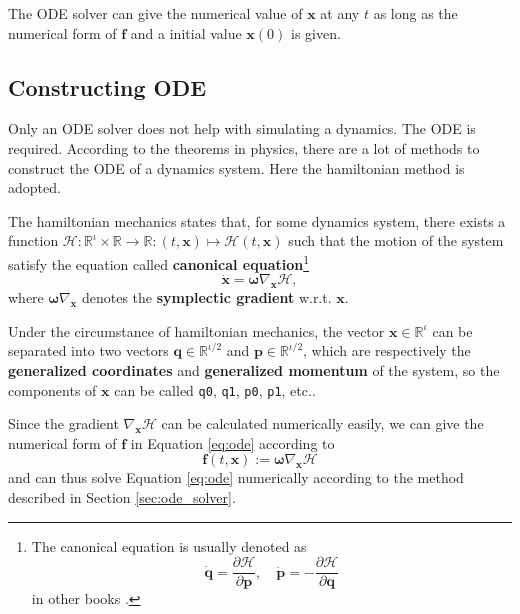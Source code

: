 \documentclass[12pt]{article}
\begin{document}
The ODE solver can give the numerical value of $\mathbf x$ at any $t$
as long as the numerical form of $\mathbf f$
and a initial value $\mathbf x\left(0\right)$
is given.

\subsection{Constructing ODE}

Only an ODE solver does not help with simulating a dynamics.
The ODE is required.
According to the theorems in physics,
there are a lot of methods to construct the ODE of a dynamics system.
Here the hamiltonian method is adopted.

The hamiltonian mechanics states that, for some dynamics system,
there exists a function
$\mathcal H:\mathbb R^\iota\times\mathbb R\rightarrow\mathbb R:\left(t,\mathbf x\right)\mapsto\mathcal H\left(t,\mathbf x\right)$
such that the motion of the system satisfy the equation
called \textbf{canonical equation}\footnote{
  The canonical equation is usually denoted as
  \begin{equation*}
    \dot{\mathbf q}=\frac{\partial\mathcal H}{\partial\mathbf p},
    \quad
    \dot{\mathbf p}=-\frac{\partial\mathcal H}{\partial\mathbf q}
  \end{equation*}
  in other books \cite{hand2008mechanics}\cite[p. 65]{arnold1989mathmech}\cite[p. 132]{landau1976mechanics}.
}
\begin{equation}
  \dot{\mathbf x}=\boldsymbol\omega\nabla_{\mathbf x}\mathcal H,
\end{equation}
where $\boldsymbol\omega\nabla_{\mathbf x}$ denotes the \textbf{symplectic gradient} w.r.t. $\mathbf x$.

Under the circumstance of hamiltonian mechanics,
the vector $\mathbf x\in\mathbb R^\iota$ can be separated into two vectors
$\mathbf q\in\mathbb R^{\iota/2}$ and $\mathbf p\in\mathbb R^{\iota/2}$,
which are respectively the \textbf{generalized coordinates} and \textbf{generalized momentum} of the system,
so the components of $\mathbf x$ can be called \texttt{q0}, \texttt{q1}, \texttt{p0}, \texttt{p1}, etc..

Since the gradient $\nabla_{\mathbf x}\mathcal H$ can be calculated numerically easily,
we can give the numerical form of $\mathbf f$ in Equation \ref{eq:ode} according to
\begin{equation}
  \mathbf f\left(t,\mathbf x\right):=\boldsymbol\omega\nabla_{\mathbf x}\mathcal H
  \label{eq:def_f}
\end{equation}
and can thus solve Equation \ref{eq:ode} numerically according to the method described in Section \ref{sec:ode_solver}.
\end{document}
